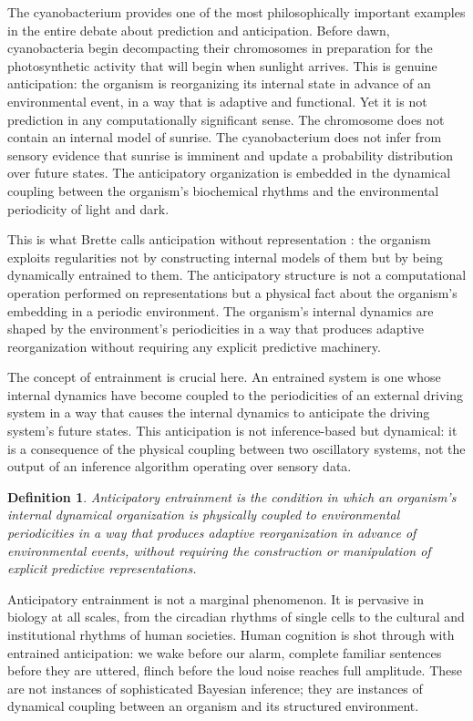 \documentclass[12pt,a4paper]{report}
\theoremstyle{flyxion}
\newtheorem{definition}[theorem]{Definition}
\begin{document}
The cyanobacterium provides one of the most philosophically important examples in the entire debate about prediction and anticipation. Before dawn, cyanobacteria begin decompacting their chromosomes in preparation for the photosynthetic activity that will begin when sunlight arrives. This is genuine anticipation: the organism is reorganizing its internal state in advance of an environmental event, in a way that is adaptive and functional. Yet it is not prediction in any computationally significant sense. The chromosome does not contain an internal model of sunrise. The cyanobacterium does not infer from sensory evidence that sunrise is imminent and update a probability distribution over future states. The anticipatory organization is embedded in the dynamical coupling between the organism's biochemical rhythms and the environmental periodicity of light and dark.

This is what Brette calls anticipation without representation \cite{brettepredictive}: the organism exploits regularities not by constructing internal models of them but by being dynamically entrained to them. The anticipatory structure is not a computational operation performed on representations but a physical fact about the organism's embedding in a periodic environment. The organism's internal dynamics are shaped by the environment's periodicities in a way that produces adaptive reorganization without requiring any explicit predictive machinery.

The concept of entrainment is crucial here. An entrained system is one whose internal dynamics have become coupled to the periodicities of an external driving system in a way that causes the internal dynamics to anticipate the driving system's future states. This anticipation is not inference-based but dynamical: it is a consequence of the physical coupling between two oscillatory systems, not the output of an inference algorithm operating over sensory data.

\begin{definition}
\emph{Anticipatory entrainment} is the condition in which an organism's internal dynamical organization is physically coupled to environmental periodicities in a way that produces adaptive reorganization in advance of environmental events, without requiring the construction or manipulation of explicit predictive representations.
\end{definition}

Anticipatory entrainment is not a marginal phenomenon. It is pervasive in biology at all scales, from the circadian rhythms of single cells to the cultural and institutional rhythms of human societies. Human cognition is shot through with entrained anticipation: we wake before our alarm, complete familiar sentences before they are uttered, flinch before the loud noise reaches full amplitude. These are not instances of sophisticated Bayesian inference; they are instances of dynamical coupling between an organism and its structured environment.
\end{document}
